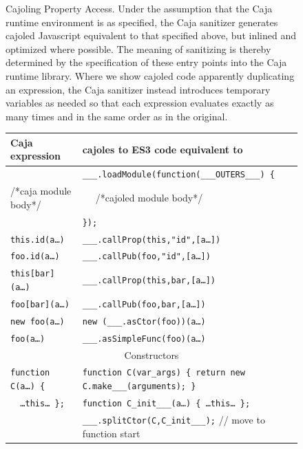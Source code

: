 \documentclass[letterpaper,twocolumn,10pt]{article}
\newcommand{\code}[1]{{\tt {#1}}}              %
\begin{document}
\begin{figure}
\caption[Cajoling Property Access]{Cajoling Property Access. Under the 
assumption that the Caja runtime environment is as specified, the Caja 
sanitizer generates cajoled Javascript equivalent to that specified above, 
but inlined and optimized where possible. The meaning of sanitizing is 
thereby determined by the specification of these entry points into the Caja 
runtime library. Where we show cajoled code apparently duplicating an 
expression, the Caja sanitizer instead introduces temporary variables as 
needed so that each expression evaluates exactly as many times and in the 
same order as in the original.}
\label{tab:prop-xlate}
\end{figure}


\begin{figure}
\begin{tabular}{ll}
  Caja expression & cajoles to ES3 code equivalent to\\ 
  \hline
                 & \code{\_\_\_.loadModule(function(\_\_\_OUTERS\_\_\_)\ \{}\\
  /*caja module body*/      
                 & \code{\ \ } /*cajoled module body*/ \\
                 & \code{\});} \\
  \hline
  \code{this.id(a\ldots)} 
                            & \code{\_\_\_.callProp(this,"id",[a\ldots])} \\
  \code{foo.id(a\ldots)}  
                            & \code{\_\_\_.callPub(foo,"id",[a\ldots])} \\
  \code{this[bar](a\ldots)} 
                            & \code{\_\_\_.callProp(this,bar,[a\ldots])} \\
  \code{foo[bar](a\ldots)}  
                            & \code{\_\_\_.callPub(foo,bar,[a\ldots])} \\
  \code{new foo(a\ldots)}   & \code{new (\_\_\_.asCtor(foo))(a\ldots)} \\
  \code{foo(a\ldots)}       & \code{\_\_\_.asSimpleFunc(foo)(a\ldots)} \\
  \hline
           \multicolumn{2}{c}{Constructors} \\
  \code{function C(a\ldots)\ \{}
  & \code{function C(var\_args)\ \{ return new C.make\_\_\_(arguments); \}} \\
  \code{\ \ {\ldots}this{\ldots}\ \};}
    & \code{function C\_init\_\_\_(a\ldots)\ \{ {\ldots}this{\ldots}\ \};} \\
    & \code{\_\_\_.splitCtor(C,C\_init\_\_\_);} // move to function start \\
    

\end{tabular}
\end{figure}
\end{document}
